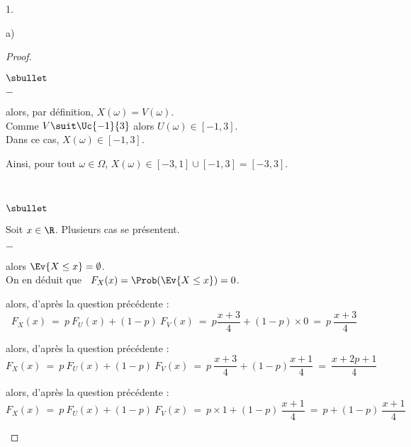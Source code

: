\documentclass[11pt]{article}%
\begin{document}
\begin{noliste}{1.}
\begin{noliste}{a)}
\begin{proof}
\begin{noliste}{$\sbullet$}
\begin{noliste}{$-$}
        \item {} alors, par définition,
          $X(\omega) = V(\omega)$.\\
          Comme $V \suit \Uc{-1}{3}$ alors $U(\omega) \in [-1,3]$.\\[.1cm]
          Dans ce cas, $X(\omega) \in [-1,3]$.
        \end{noliste}
        Ainsi, pour tout $\omega \in \Omega$, $X(\omega) \in [-3,1]
        \cup [-1,3] = [-3,3]$.%
        ~\\[-1.2cm]
      \end{noliste}
      ~\\[-1.4cm]
      \begin{noliste}{$\sbullet$}
      \item Soit $x\in\R$. Plusieurs cas se présentent.
        \begin{noliste}{$-$}
        \item {} alors $\Ev{X \leq x} =
          \emptyset$.\\[.1cm]
          On en déduit que \ $F_X(x) = \Prob(\Ev{X\leq x}) = 0$.
    
        \item {} alors, d'après la question
          précédente : 
          \[
          F_X(x) \ = \ p \ F_U(x) + (1-p) \ F_V(x) \ = \ p
          \dfrac{x+3}{4} + (1-p) \times 0 \ = \ p \ \dfrac{x+3}{4}
          \]
          
        \item {} alors, d'après la question
          précédente : 
          \[
          F_X(x) \ = \ p \ F_U(x) + (1-p) \ F_V(x) \ = \ p \
          \dfrac{x+3}{4}+(1-p)\frac{x+1}{4} \ = \ \dfrac{x+2p+1}{4}
          \]
          
        \item {} alors, d'après la question
          précédente :
          \[
          F_X(x) \ = \ p \ F_U(x) + (1-p) \ F_V(x) \ = \ p \times 1 +
          (1-p) \ \dfrac{x+1}{4} \ = \ p + (1-p) \ \dfrac{x+1}{4}
          \]
          

\end{noliste}
\end{noliste}
\end{proof}
\end{noliste}
\end{noliste}
\end{document}
